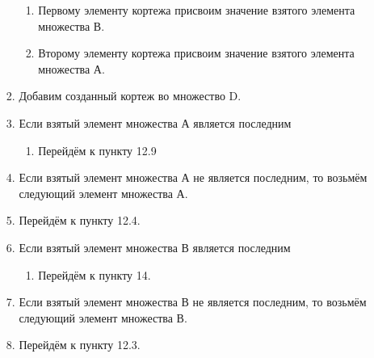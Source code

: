 \documentclass[a4paper,12pt]{extarticle}
\begin{document}
\begin{enumerate}
\begin{enumerate}[label*=\arabic*.]
\begin{enumerate}[label*=\arabic*.]
\begin{enumerate}[label*=\arabic*.]
        \item Первому элементу кортежа присвоим значение взятого элемента множества В.
        \item Второму элементу кортежа присвоим значение взятого элемента множества А.
      \end{enumerate}
      \item Добавим созданный кортеж во множество D.
      \item Если взятый элемент множества А является последним
      \begin{enumerate}[label*=\arabic*.]
        \item Перейдём к пункту 12.9
      \end{enumerate}
      \item Если взятый элемент множества А не является последним, то возьмём следующий элемент множества А.
      \item Перейдём к пункту 12.4.
      \item Если взятый элемент множества В является последним
      \begin{enumerate}[label*=\arabic*.]
        \item Перейдём к пункту 14.
      \end{enumerate}
      \item Если взятый элемент множества В не является последним, то возьмём следующий элемент множества В.
      \item Перейдём к пункту 12.3.
    \end{enumerate}
  \end{enumerate}
  \
\end{enumerate}
\end{document}
